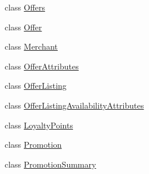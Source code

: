 \begin{DoxyCompactItemize}
class \hyperlink{class_price___comparison_1_1amazon_1_1ecs_1_1_offers}{Offers}
\begin{DoxyCompactList}\small\item\em \end{DoxyCompactList}\item 
class \hyperlink{class_price___comparison_1_1amazon_1_1ecs_1_1_offer}{Offer}
\begin{DoxyCompactList}\small\item\em \end{DoxyCompactList}\item 
class \hyperlink{class_price___comparison_1_1amazon_1_1ecs_1_1_merchant}{Merchant}
\begin{DoxyCompactList}\small\item\em \end{DoxyCompactList}\item 
class \hyperlink{class_price___comparison_1_1amazon_1_1ecs_1_1_offer_attributes}{Offer\-Attributes}
\begin{DoxyCompactList}\small\item\em \end{DoxyCompactList}\item 
class \hyperlink{class_price___comparison_1_1amazon_1_1ecs_1_1_offer_listing}{Offer\-Listing}
\begin{DoxyCompactList}\small\item\em \end{DoxyCompactList}\item 
class \hyperlink{class_price___comparison_1_1amazon_1_1ecs_1_1_offer_listing_availability_attributes}{Offer\-Listing\-Availability\-Attributes}
\begin{DoxyCompactList}\small\item\em \end{DoxyCompactList}\item 
class \hyperlink{class_price___comparison_1_1amazon_1_1ecs_1_1_loyalty_points}{Loyalty\-Points}
\begin{DoxyCompactList}\small\item\em \end{DoxyCompactList}\item 
class \hyperlink{class_price___comparison_1_1amazon_1_1ecs_1_1_promotion}{Promotion}
\begin{DoxyCompactList}\small\item\em \end{DoxyCompactList}\item 
class \hyperlink{class_price___comparison_1_1amazon_1_1ecs_1_1_promotion_summary}{Promotion\-Summary}

\end{DoxyCompactItemize}
